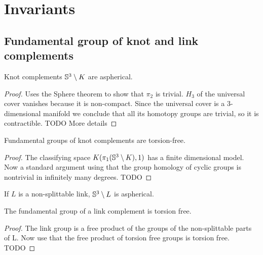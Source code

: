 \newpage
\section{Invariants}

\subsection{Fundamental group of knot and link complements}

\begin{proposition}
	Knot complements $\mathbb{S}^{3} \setminus K$
	are aspherical.
\end{proposition}
\begin{proof}
	Uses the Sphere theorem to show that $\pi_{2}$ is trivial.
	$H_{3}$ of the universal cover vanishes because it is non-compact.
	Since the universal cover is a $3$-dimensional manifold we conclude that
	all its homotopy groups are trivial, so it is contractible.
	TODO More details
\end{proof}

\begin{corollary}
	Fundamental groups of knot complements are torsion-free.
\end{corollary}

\begin{proof}
	The classifying space $K(\pi_1(\mathbb{S}^{3} \setminus K), 1)$
	has a finite dimensional model.
	Now a standard argument using that the group homology of
	cyclic groups is nontrivial in infinitely many degrees.
	TODO
\end{proof}

\begin{proposition}
	If $L$ is a non-splittable link, $\mathbb{S}^{3} \setminus L$
	is aspherical.
\end{proposition}

\begin{corollary}
	The fundamental group of a link complement is torsion free.
\end{corollary}
\begin{proof}
	The link group is a free product of the groups
	of the non-splittable parts of L.
	Now use that the free product of torsion free groups is
	torsion free. 
	TODO 
\end{proof}





